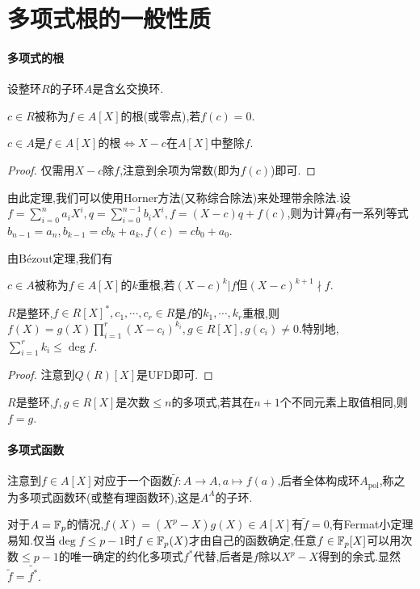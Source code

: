 \documentclass[openany]{book}
\begin{document}
\section{多项式根的一般性质}
\paragraph{多项式的根}设整环$R$的子环$A$是含幺交换环.
\begin{definition}[多项式的根]
    $c\in R$被称为$f\in A[X]$的根(或零点),若$f(c)=0$.
\end{definition}
\begin{theorem}[B\'ezout定理]
    $c\in A$是$f\in A[X]$的根$\iff X-c$在$A[X]$中整除$f$.
\end{theorem}
\begin{proof}
    仅需用$X-c$除$f$,注意到余项为常数(即为$f(c)$)即可.
\end{proof}

由此定理,我们可以使用Horner方法(又称综合除法)来处理带余除法.设$f=\sum_{i=0}^n a_iX^i, q=\sum_{i=0}^{n-1}b_iX^i, f=(X-c)q+f(c)$,则为计算$q$有一系列等式$b_{n-1}=a_n, b_{k-1}=cb_k+a_k, f(c)=cb_0+a_0$.

由B\'ezout定理,我们有
\begin{definition}[多重根]
    $c\in A$被称为$f\in A[X]$的$k$重根,若$(X-c)^k|f$但$(X-c)^{k+1}\nmid f$.
\end{definition}
\begin{theorem}
    $R$是整环,$f\in R[X]^*, c_1,\cdots,c_r\in R$是$f$的$k_1,\cdots,k_r$重根,则$f(X)=g(X)\prod_{i=1}^r (X-c_i)^{k_i}, g\in R[X], g(c_i)\neq 0$.特别地,$\sum_{i=1}^r k_i\leq \deg f$.
\end{theorem}
\begin{proof}
    注意到$Q(R)[X]$是UFD即可.
\end{proof}
\begin{proposition}
    $R$是整环,$f,g\in R[X]$是次数$\leq n$的多项式,若其在$n+1$个不同元素上取值相同,则$f=g$.
\end{proposition}

\paragraph{多项式函数}注意到$f\in A[X]$对应于一个函数$\tilde{f}:A\to A, a\mapsto f(a)$,后者全体构成环$A_{\mathrm{pol}}$,称之为多项式函数环(或整有理函数环),这是$A^A$的子环.

对于$A=\mathbb{F}_p$的情况,$f(X)=(X^p-X)g(X)\in A[X]$有$\tilde{f}=0$,有Fermat小定理易知.仅当$\deg f\leq p-1$时$f\in \mathbb{F}_p(X)$才由自己的函数确定,任意$f\in \mathbb{F}_p[X]$可以用次数$\leq p-1$的唯一确定的约化多项式$f^*$代替,后者是$f$除以$X^p-X$得到的余式.显然$\tilde{f}=\tilde{f^*}$.
\end{document}
